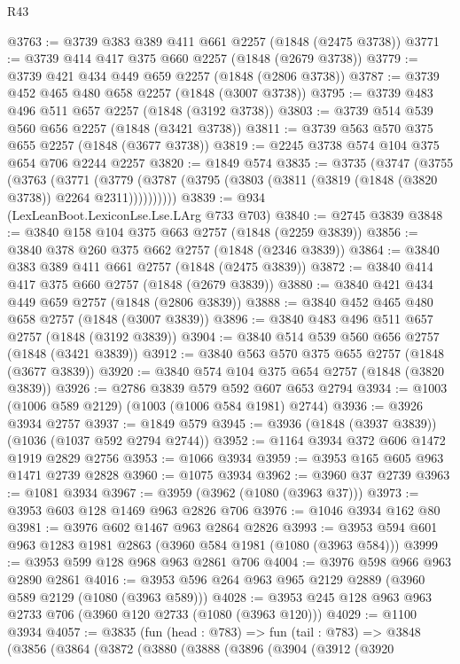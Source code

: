 \begin{lexlean}{R43}
\begin{coremodule}
@3763 := @3739 @383 @389 @411 @661 @2257 (@1848 (@2475 @3738))
@3771 := @3739 @414 @417 @375 @660 @2257 (@1848 (@2679 @3738))
@3779 := @3739 @421 @434 @449 @659 @2257 (@1848 (@2806 @3738))
@3787 := @3739 @452 @465 @480 @658 @2257 (@1848 (@3007 @3738))
@3795 := @3739 @483 @496 @511 @657 @2257 (@1848 (@3192 @3738))
@3803 := @3739 @514 @539 @560 @656 @2257 (@1848 (@3421 @3738))
@3811 := @3739 @563 @570 @375 @655 @2257 (@1848 (@3677 @3738))
@3819 := @2245 @3738 @574 @104 @375 @654 @706 @2244 @2257
@3820 := @1849 @574
@3835 := @3735
    (@3747
      (@3755
        (@3763
          (@3771
            (@3779 (@3787 (@3795 (@3803 (@3811 (@3819 (@1848 (@3820 @3738)) @2264 @2311))))))))))
@3839 := @934 (LexLeanBoot.LexiconLse.Lse.LArg @733 @703)
@3840 := @2745 @3839
@3848 := @3840 @158 @104 @375 @663 @2757 (@1848 (@2259 @3839))
@3856 := @3840 @378 @260 @375 @662 @2757 (@1848 (@2346 @3839))
@3864 := @3840 @383 @389 @411 @661 @2757 (@1848 (@2475 @3839))
@3872 := @3840 @414 @417 @375 @660 @2757 (@1848 (@2679 @3839))
@3880 := @3840 @421 @434 @449 @659 @2757 (@1848 (@2806 @3839))
@3888 := @3840 @452 @465 @480 @658 @2757 (@1848 (@3007 @3839))
@3896 := @3840 @483 @496 @511 @657 @2757 (@1848 (@3192 @3839))
@3904 := @3840 @514 @539 @560 @656 @2757 (@1848 (@3421 @3839))
@3912 := @3840 @563 @570 @375 @655 @2757 (@1848 (@3677 @3839))
@3920 := @3840 @574 @104 @375 @654 @2757 (@1848 (@3820 @3839))
@3926 := @2786 @3839 @579 @592 @607 @653 @2794
@3934 := @1003 (@1006 @589 @2129) (@1003 (@1006 @584 @1981) @2744)
@3936 := @3926 @3934 @2757
@3937 := @1849 @579
@3945 := @3936 (@1848 (@3937 @3839)) (@1036 (@1037 @592 @2794 @2744))
@3952 := @1164 @3934 @372 @606 @1472 @1919 @2829 @2756
@3953 := @1066 @3934
@3959 := @3953 @165 @605 @963 @1471 @2739 @2828
@3960 := @1075 @3934
@3962 := @3960 @37 @2739
@3963 := @1081 @3934
@3967 := @3959 (@3962 (@1080 (@3963 @37)))
@3973 := @3953 @603 @128 @1469 @963 @2826 @706
@3976 := @1046 @3934 @162 @80
@3981 := @3976 @602 @1467 @963 @2864 @2826
@3993 := @3953 @594 @601 @963 @1283 @1981 @2863 (@3960 @584 @1981 (@1080 (@3963 @584)))
@3999 := @3953 @599 @128 @968 @963 @2861 @706
@4004 := @3976 @598 @966 @963 @2890 @2861
@4016 := @3953 @596 @264 @963 @965 @2129 @2889 (@3960 @589 @2129 (@1080 (@3963 @589)))
@4028 := @3953 @245 @128 @963 @963 @2733 @706 (@3960 @120 @2733 (@1080 (@3963 @120)))
@4029 := @1100 @3934
@4057 := @3835
    (fun (head : @783) =>
    fun (tail : @783) =>
    @3848
      (@3856
        (@3864
          (@3872
            (@3880
              (@3888
                (@3896
                  (@3904
                    (@3912
                      (@3920

\end{coremodule}
\end{lexlean}
